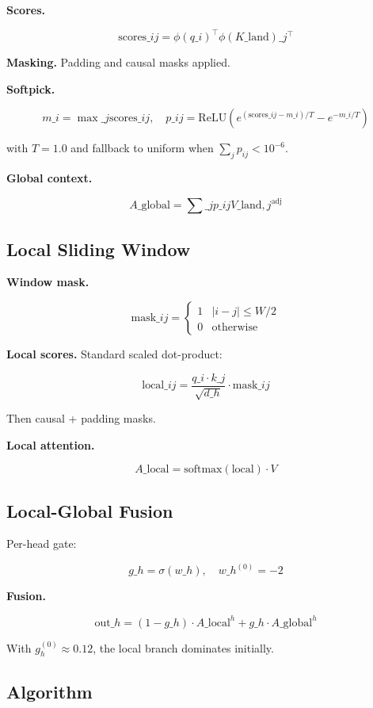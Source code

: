 \textbf{Scores.}

\[
\text{scores}\_{ij} = \phi(q\_i)^\top \phi(K\_\text{land})\_j^\top
\tag{4.7}
\]

\textbf{Masking.} Padding and causal masks applied.

\textbf{Softpick.}

\[
m\_i = \max\_j \text{scores}\_{ij}, \quad
p\_{ij} = \text{ReLU}\!\left(e^{(\text{scores}\_{ij} - m\_i)/T} - e^{-m\_i/T}\right)
\tag{4.8}
\]

with $T = 1.0$ and fallback to uniform when $\sum_j p_{ij} < 10^{-6}$.

\textbf{Global context.}

\[
A\_\text{global} = \sum\_j p\_{ij} V\_{\text{land}, j}^\text{adj}
\tag{4.9}
\]

\subsection{Local Sliding Window}

\textbf{Window mask.}

\[
\text{mask}\_{ij} = \begin{cases} 1 & |i - j| \leq W/2 \\ 0 & \text{otherwise} \end{cases}
\tag{4.10}
\]

\textbf{Local scores.} Standard scaled dot-product:

\[
\text{local}\_{ij} = \frac{q\_i \cdot k\_j}{\sqrt{d\_h}} \cdot \text{mask}\_{ij}
\tag{4.11}
\]

Then causal + padding masks.

\textbf{Local attention.}

\[
A\_\text{local} = \text{softmax}(\text{local}) \cdot V
\tag{4.12}
\]

\subsection{Local-Global Fusion}

Per-head gate:

\[
g\_h = \sigma(w\_h), \quad w\_h^{(0)} = -2
\tag{4.13}
\]

\textbf{Fusion.}

\[
\text{out}\_h = (1 - g\_h) \cdot A\_\text{local}^h + g\_h \cdot A\_\text{global}^h
\tag{4.14}
\]

With $g_h^{(0)} \approx 0.12$, the local branch dominates initially.

\subsection{Algorithm}

